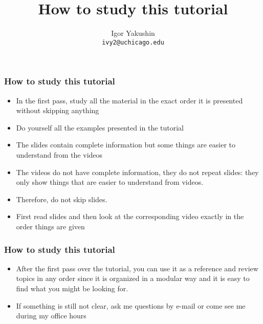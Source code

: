 \documentclass{beamer}
\title{\huge{How to study this tutorial}}
\author{Igor Yakushin \\ \texttt{ivy2@uchicago.edu}}
\date{}
\newcommand{\RCCLogo}{
\begin{textblock}{14}(1.5,1.5)
  \pgfuseimage{logo_rcc}
\end{textblock}
}
\begin{document}



\begin{frame}
\titlepage
\end{frame}

\begin{frame}[fragile]
  \frametitle{How to study this tutorial}
  \begin{itemize}
  \item In the first pass, study all the material in the exact order it is presented without skipping anything
  \item Do yourself all the examples presented in the tutorial
  \item The slides contain complete information but some things are easier to understand from the videos
  \item The videos do not have complete information, they do not repeat slides:
    they only show things that are easier to understand from videos.
  \item Therefore, do not skip slides.
  \item First read slides and then look at the corresponding video
    exactly in the order things are given
  \end{itemize}
\end{frame}


\begin{frame}[fragile]
  \frametitle{How to study this tutorial}
  \begin{itemize}
  \item After the first pass over the tutorial, you can use it as a reference and review topics in any order
    since it is organized in a modular way and it is easy to find what you might be looking for.    
  \item If something is still not clear, ask me questions by e-mail or come see me during my office hours
  \end{itemize}
\end{frame}
\end{document}
